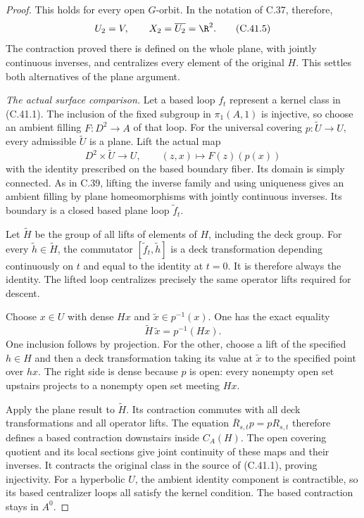 \begin{proof}
This holds for every open $G$-orbit. In the
notation of C.37, therefore,
\[
 U_2=V,\qquad
 X_2=\overline{U_2}=\R^2.
                                                        \tag{C.41.5}
\]
The contraction proved there is defined on
the whole plane, with jointly continuous
inverses, and centralizes every element of
the original $H$. This settles both alternatives
of the plane argument.

\emph{The actual surface comparison.}
Let a based loop $f_t$ represent a kernel class
in (C.41.1). The inclusion of the fixed
subgroup in $\pi_1(A,1)$ is injective, so
choose an ambient filling
$F:D^2\to A$ of that loop.
For the universal covering
$p:\widetilde U\to U$, every admissible
$\widetilde U$ is a plane. Lift the actual map
\[
 D^2\times\widetilde U\longrightarrow U,\qquad
           (z,x)\longmapsto F(z)(p(x))
                                                        \tag{C.41.6}
\]
with the identity prescribed on the based
boundary fiber. Its domain is simply connected.
As in C.39, lifting the inverse family and
using uniqueness gives an ambient filling by
plane homeomorphisms with jointly continuous
inverses. Its boundary is a closed based
plane loop $\widetilde f_t$.

Let $\widetilde H$ be the group of all lifts
of elements of $H$, including the deck group.
For every $\widetilde h\in\widetilde H$,
the commutator
$[\widetilde f_t,\widetilde h]$ is a deck
transformation depending continuously on $t$
and equal to the identity at $t=0$.
It is therefore always the identity.
The lifted loop centralizes precisely the
same operator lifts required for descent.

Choose $x\in U$ with dense $Hx$ and
$\widetilde x\in p^{-1}(x)$. One has the
exact equality
\[
       \widetilde H\,\widetilde x=p^{-1}(Hx).
                                                        \tag{C.41.7}
\]
One inclusion follows by projection. For the
other, choose a lift of the specified
$h\in H$ and then a deck transformation
taking its value at $\widetilde x$ to the
specified point over $hx$.
The right side is dense because $p$ is open:
every nonempty open set upstairs projects
to a nonempty open set meeting $Hx$.

Apply the plane result to $\widetilde H$.
Its contraction commutes with all deck
transformations and all operator lifts.
The equation
$\overline R_{s,t}p=pR_{s,t}$ therefore
defines a based contraction downstairs
inside $C_A(H)$. The open covering quotient
and its local sections give joint continuity
of these maps and their inverses.
It contracts the original class in the
source of (C.41.1), proving injectivity.
For a hyperbolic $U$, the ambient identity
component is contractible, so its based
centralizer loops all satisfy the kernel
condition. The based contraction stays in
$A^0$.
\end{proof}

